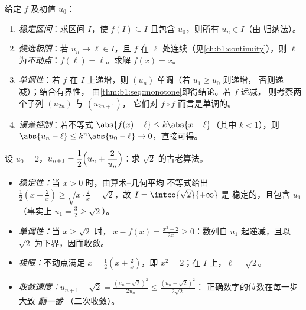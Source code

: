 \begin{method}[研究 $u_{n+1} = f(u_n)$]\label{met:b1:seq:recurrent}
给定 $f$ 及初值 $u_0$：
\begin{enumerate}
  \item \emph{稳定区间}：求区间 $I$，使 $f(I)
        \subseteq I$ 且包含 $u_0$，则所有 $u_n \in I$（由
        归纳法）。
  \item \emph{候选极限}：若 $u_n \to \ell \in I$，且 $f$
        在 $\ell$ 处连续（见\cref{ch:b1:continuity}），则 $\ell$
        为\emph{不动点}：$f(\ell) = \ell$。求解 $f(x) = x$。
  \item \emph{单调性}：若 $f$ 在 $I$ 上递增，则
        $(u_n)$ 单调（若 $u_1 \geq u_0$ 则递增，
        否则递减）；结合有界性，
        由\cref{thm:b1:seq:monotone}即得结论。若 $f$ 递减，
        则考察两个子列 $(u_{2n})$ 与 $(u_{2n+1})$，
        它们对 $f \circ f$ 而言是单调的。
  \item \emph{误差控制}：若不等式 $\abs{f(x) - \ell} \leq
        k\abs{x - \ell}$（其中 $k < 1$），则 $\abs{u_n - \ell} \leq
        k^n \abs{u_0 - \ell} \to 0$，直接可得。
\end{enumerate}
\end{method}

\begin{example}[海伦方法]\label{ex:b1:seq:heron}
设 $u_0 = 2$，$u_{n+1} = \dfrac12\Bigl(u_n +
\dfrac{2}{u_n}\Bigr)$：求
$\sqrt 2$ 的古老算法。
\begin{itemize}
  \item \emph{稳定性：}当 $x > 0$ 时，由算术--几何平均
        不等式给出 $\frac12(x + \frac2x) \geq \sqrt{x \cdot
        \frac 2x} = \sqrt 2$，故 $I = \intco{\sqrt 2}{+\infty}$ 是
        稳定的，且包含 $u_1$（事实上 $u_1 = \frac32 \geq
        \sqrt 2$）。
  \item \emph{单调性：}当 $x \geq \sqrt 2$ 时，$\;x - f(x) =
        \frac{x^2 - 2}{2x} \geq 0$：数列自
        $u_1$ 起递减，且以 $\sqrt 2$ 为下界，因而收敛。
  \item \emph{极限：}不动点满足 $x = \frac12(x +
        \frac2x)$，即 $x^2 = 2$；在 $I$ 上，$\ell = \sqrt 2$。
  \item \emph{收敛速度：}$u_{n+1} - \sqrt 2 = \frac{(u_n -
        \sqrt2)^2}{2u_n} \leq \frac{(u_n - \sqrt 2)^2}{2\sqrt 2}$：
        正确数字的位数在每一步大致 \emph{翻一番}
        （二次收敛）。
\end{itemize}
\end{example}

